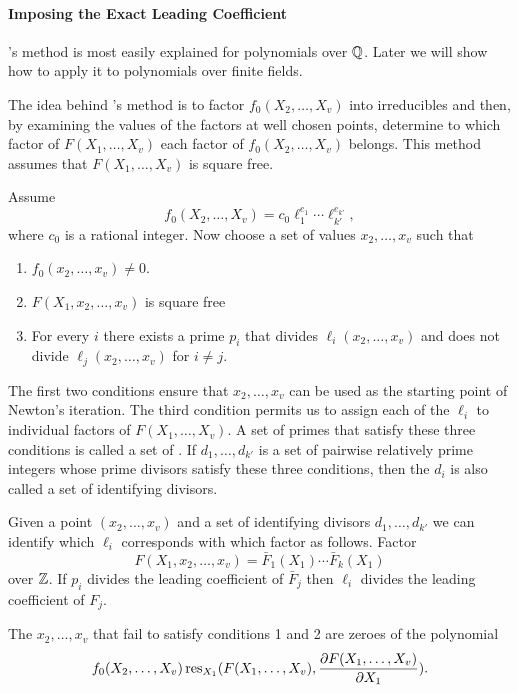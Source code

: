 \paragraph{Imposing the Exact Leading Coefficient}

{\WangP}'s method \cite{Wang1978-iu} is most easily explained for
polynomials over $\mathbb{Q}$.  Later we will show how to apply it to
polynomials over finite fields.

The idea behind {\WangP}'s method is to factor $f_0(X_2, \ldots, X_v)$
into irreducibles and then, by examining the values of the factors at
well chosen points, determine to which factor of $F(X_1, \ldots, X_v)$
each factor of $f_0(X_2, \ldots, X_v)$ belongs.  This method  assumes
that $F(X_1, \ldots, X_v)$ is square free.

Assume 
\[
f_0(X_2, \ldots, X_v) = c_0 \ell_1^{e_1} \cdots \ell_{k'}^{e_{k'}},
\]
where $c_0$ is a rational integer. 
Now choose a set of values $x_2, \ldots, x_v$ such that
\begin{enumerate}
\item $f_0(x_2, \ldots, x_v) \not= 0$.
\item $F(X_1, x_2, \ldots, x_v)$ is square free
\item For every $i$ there exists a prime $p_i$ that divides
$\ell_i(x_2, \ldots, x_v)$ and does not divide $\ell_j(x_2, \ldots,
x_v)$ for $i \not=j$.
\end{enumerate}

The first two conditions ensure that $x_2, \ldots, x_v$ can be used as
the starting point of Newton's iteration.  The third condition permits
us to assign each of the $\ell_i$ to individual factors of $F(X_1,
\ldots, X_v)$.  A set of primes that satisfy these three conditions is
called a set of .  If $d_1, \ldots, d_{k'}$
is a set of pairwise relatively prime integers whose prime divisors
satisfy these three conditions, then the $d_i$ is also called a set of
identifying divisors.

Given a point $(x_2, \ldots, x_v)$ and a set of identifying divisors
$d_1, \ldots, d_{k'}$ we can identify which $\ell_i$ corresponds with
which factor as follows.  Factor
\[
F(X_1, x_2, \ldots, x_v) = \bar{F}_1(X_1) \cdots \bar{F}_k(X_1)
\]
over $\mathbb{Z}$.  If $p_i$ divides the leading coefficient of $\bar{F}_j$
then $\ell_i$ divides the leading coefficient of $F_j$.  


The $x_2, \ldots, x_v$ that fail to satisfy conditions 1 and 2 are
zeroes of the polynomial
\[
f_0(X_2, \ldots, X_v) \mathop{\rm res}\nolimits_{X_1}(F(X_1, \ldots, X_v), \frac{\partial
F(X_1, \ldots, X_v)}{\partial X_1}).
\]

